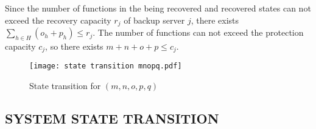\documentclass[conference]{IEEEtran}
\begin{document}
Since the number of functions in the being recovered and recovered states can not exceed the recovery capacity $r_j$ of backup server $j$, there exists $\sum_{h \in H} (o_h+p_h) \le r_j$. The number of functions can not exceed the protection capacity $c_j$, so there exists $m+n+o+p \le c_j$.

\begin{figure}[H]
\centerline{\texttt{[image: state transition mnopq.pdf]}}
\caption{State transition for $(m,n,o,p,q)$}
\end{figure}

\subsection{SYSTEM STATE TRANSITION}
\begin{table*}[htbp]
\caption{feasible system state transition incoming to $(m,n,o,p,q)$}
\begin{center}
\end{center}
\end{table*}
\end{document}
